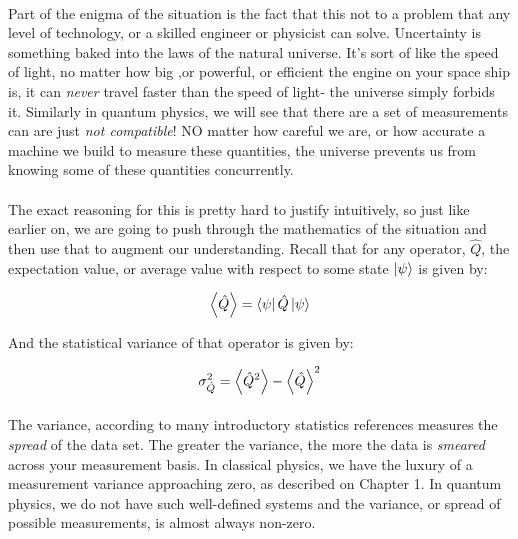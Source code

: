 \documentclass[12pt,letterpaper]{book}
\begin{document}
\paragraph*{}Part of the enigma of the situation is the fact that this not to a problem that any level of technology, or a skilled engineer or physicist can solve. Uncertainty is something baked into the laws of the natural universe. It's sort of like the speed of light, no matter how big ,or powerful, or efficient the engine on your space ship is, it can \textit{never} travel faster than the speed of light- the universe simply forbids it. Similarly in quantum physics, we will see that there are a set of measurements can are just \textit{not compatible}! NO matter how careful we are, or how accurate a machine we build to measure these quantities, the universe prevents us from knowing some of these quantities concurrently. 

\paragraph*{}The exact reasoning for this is pretty hard to justify intuitively, so just like earlier on, we are going to push through the mathematics of the situation and then use that to augment our understanding. Recall that for any operator, 
$\hat{Q}$, the expectation value, or average value with respect to some state 
$\ket{\psi}$ is given by:

\begin{equation}
\expval{\hat{Q}} = \bra{\psi}\hat{Q}\ket{\psi}
\end{equation}

And the statistical variance of that operator is given by:

\begin{equation}
\sigma^{2}_{\hat{Q}} =  \expval{\hat{Q}^2} - \expval{\hat{Q}}^2
\end{equation}

\paragraph*{}The variance, according to many introductory statistics references measures the \textit{spread} of the data set. The greater the variance, the more the data is \textit{smeared} across your measurement basis. In classical physics, we have the luxury of a measurement variance approaching zero, as described on Chapter 1. In quantum physics, we do not have such well-defined systems and the variance, or spread of possible measurements, is almost always non-zero.
\end{document}
